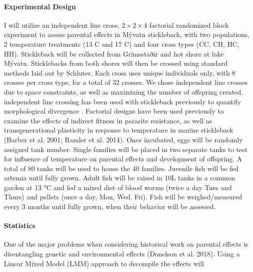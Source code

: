 \documentclass[12pt]{extarticle}
\begin{document}
\paragraph{Experimental Design}
I will utilize an independent line cross, $2 \times 2 \times 4$ factorial randomized block experiment to assess parental effects in Mývatn stickleback, with two populations, 2 temperature treatments (13 \degree C and 17 \degree C) and four cross types (CC, CH, HC, HH). Stickleback will be collected from Grímsstaðir and hot shore at lake M\'yvatn. Sticklebacks from both shores will then be crossed using standard methods laid out by Schluter. Each cross uses unique individuals only, with 8 crosses per cross type, for a total of 32 crosses. We chose independent line crosses due to space constraints, as well as maximizing the number of offspring created. independent line crossing has been used with stickleback previously to quantify morphological divergence \citep{Berner2011}. Factorial designs have been used previously to examine the effects of indirect fitness in parasite resistance, as well as transgenerational plasticity in response to temperature in marine stickleback (Barber et al. 2001; Ramler et al. 2014). Once incubated, eggs will be randomly assigned tank number. Single families will be placed in two separate tanks to test for influence of temperature on parental effects and development of offspring. A total of 80 tanks will be used to house the 40 families. Juvenile fish will be fed artemia until fully grown. Adult fish will be raised in 10L tanks in a common garden at 13 °C and fed a mixed diet of blood worms (twice a day Tues and Thurs) and pellets (once a day, Mon, Wed, Fri). Fish will be weighed/measured every 3 months until fully grown, when their behavior will be assessed. 


\paragraph{Statistics} One of the major problems when considering historical work on parental effects is disentangling genetic and environmental effects (Donelson et al. 2018). Using a Linear Mixed Model (LMM) approach to decompile the effects will 
\end{document}
